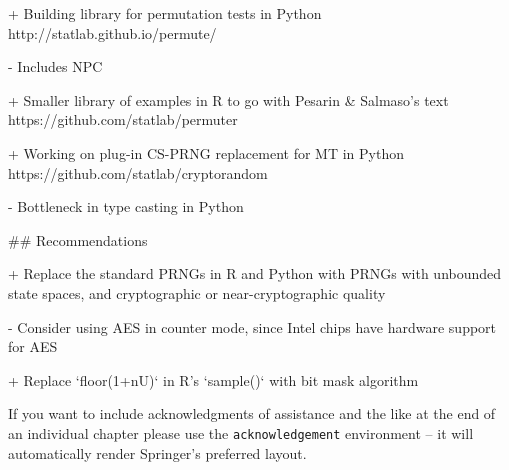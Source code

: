 \documentclass[graybox]{svmult}
\begin{document}
+ Building library for permutation tests in Python http://statlab.github.io/permute/

    - Includes NPC

+ Smaller library of examples in R to go with Pesarin & Salmaso's text https://github.com/statlab/permuter

+ Working on plug-in CS-PRNG replacement for MT in Python https://github.com/statlab/cryptorandom

    - Bottleneck in type casting in Python
    
## Recommendations

+ Replace the standard PRNGs in R and Python with PRNGs with unbounded state spaces, and cryptographic or near-cryptographic quality

    - Consider using AES in counter mode, since Intel chips have hardware support for AES

+ Replace `floor(1+nU)` in R's `sample()` with bit mask algorithm




\begin{acknowledgement}
If you want to include acknowledgments of assistance and the like at the end of an individual chapter please use the \verb|acknowledgement| environment -- it will automatically render Springer's preferred layout.
\end{acknowledgement}
%



\end{document}
